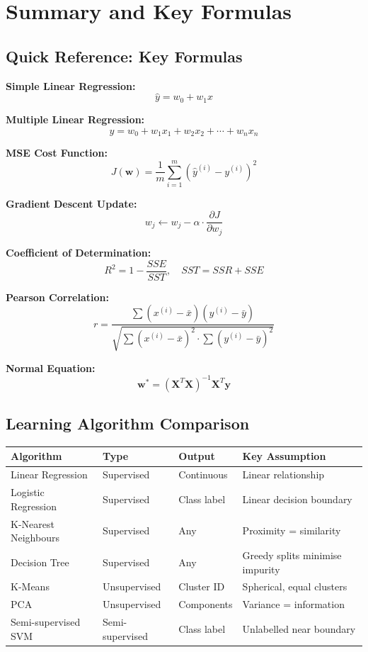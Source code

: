 \documentclass[12pt,a4paper]{report}
\begin{document}
\chapter{Summary and Key Formulas}

\section{Quick Reference: Key Formulas}

\begin{tcolorbox}[colback=light, colframe=primary, boxrule=2pt, arc=8pt, title=\textbf{Essential Formulas for Exam Review}, fonttitle=\bfseries\color{white}]

\textbf{Simple Linear Regression:}
\[ \hat{y} = w_0 + w_1 x \]

\textbf{Multiple Linear Regression:}
\[ \hat{y} = w_0 + w_1 x_1 + w_2 x_2 + \cdots + w_n x_n \]

\textbf{MSE Cost Function:}
\[ J(\mathbf{w}) = \frac{1}{m}\sum_{i=1}^{m}(\hat{y}^{(i)} - y^{(i)})^2 \]

\textbf{Gradient Descent Update:}
\[ w_j \leftarrow w_j - \alpha \cdot \frac{\partial J}{\partial w_j} \]

\textbf{Coefficient of Determination:}
\[ R^2 = 1 - \frac{SSE}{SST}, \quad SST = SSR + SSE \]

\textbf{Pearson Correlation:}
\[ r = \frac{\sum(x^{(i)}-\bar{x})(y^{(i)}-\bar{y})}{\sqrt{\sum(x^{(i)}-\bar{x})^2 \cdot \sum(y^{(i)}-\bar{y})^2}} \]

\textbf{Normal Equation:}
\[ \mathbf{w}^* = (\mathbf{X}^T\mathbf{X})^{-1}\mathbf{X}^T\mathbf{y} \]
\end{tcolorbox}

\section{Learning Algorithm Comparison}

\begin{center}
\begin{tabular}{llll}
\toprule
\textbf{Algorithm} & \textbf{Type} & \textbf{Output} & \textbf{Key Assumption} \\
\midrule
Linear Regression & Supervised & Continuous & Linear relationship \\
Logistic Regression & Supervised & Class label & Linear decision boundary \\
K-Nearest Neighbours & Supervised & Any & Proximity = similarity \\
Decision Tree & Supervised & Any & Greedy splits minimise impurity \\
K-Means & Unsupervised & Cluster ID & Spherical, equal clusters \\
PCA & Unsupervised & Components & Variance = information \\
Semi-supervised SVM & Semi-supervised & Class label & Unlabelled near boundary \\
\bottomrule
\end{tabular}
\end{center}
\end{document}
